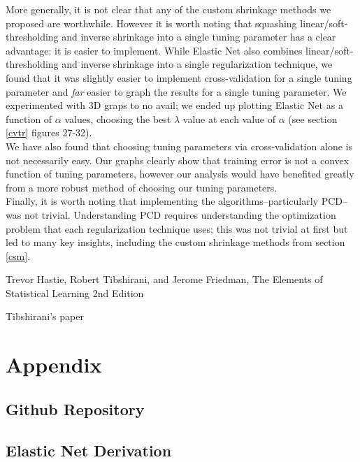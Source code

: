 \documentclass[11pt]{article}
\begin{document}
More generally, it is not clear that any of the custom shrinkage methods we proposed are worthwhile.  However it is worth noting that squashing linear/soft-thresholding and inverse shrinkage into a single tuning parameter has a clear advantage: it is easier to implement.  While Elastic Net also combines linear/soft-thresholding and inverse shrinkage into a single regularization technique, we found that it was slightly easier to implement cross-validation for a single tuning parameter and \textit{far} easier to graph the results for a single tuning parameter.  We experimented with 3D graps to no avail; we ended up plotting Elastic Net as a function of $\alpha$ values, choosing the best $\lambda$ value at each value of $\alpha$ (see section \ref{cvtr} figures 27-32).  \\

We have also found that choosing tuning parameters via cross-validation alone is not necessarily easy.  Our graphs clearly show that training error is not a convex function of tuning parameters, however our analysis would have benefited greatly from a more robust method of choosing our tuning parameters.  \\

Finally, it is worth noting that implementing the algorithms--particularly PCD--was not trivial.  Understanding PCD requires understanding the optimization problem that each regularization technique uses; this was not trivial at first but led to many key insights, including the custom shrinkage methods from section \ref{csm}.  


\begin{thebibliography}{9}
Trevor Hastie, Robert Tibshirani, and Jerome Friedman,
The Elements of Statistical Learning 2nd Edition

Tibshirani's paper
\end{thebibliography}

\section{Appendix}

\subsection{Github Repository}

\subsection{Elastic Net Derivation}
\end{document}
